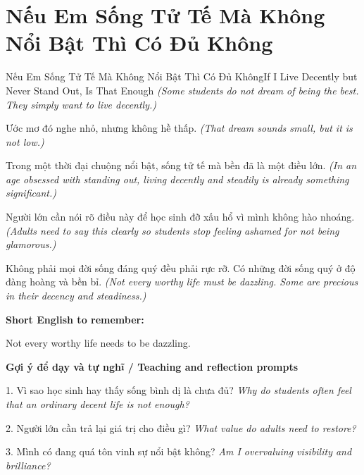 \section{Nếu Em Sống Tử Tế Mà Không Nổi Bật Thì Có Đủ Không}
\begin{truyen}{Nếu Em Sống Tử Tế Mà Không Nổi Bật Thì Có Đủ Không}{If I Live Decently but Never Stand Out, Is That Enough}
\textit{(Some students do not dream of being the best. They simply want to live decently.)}

Ước mơ đó nghe nhỏ, nhưng không hề thấp.
\textit{(That dream sounds small, but it is not low.)}

Trong một thời đại chuộng nổi bật, sống tử tế mà bền đã là một điều lớn.
\textit{(In an age obsessed with standing out, living decently and steadily is already something significant.)}

Người lớn cần nói rõ điều này để học sinh đỡ xấu hổ vì mình không hào nhoáng.
\textit{(Adults need to say this clearly so students stop feeling ashamed for not being glamorous.)}

\end{truyen}

\begin{baihoc}
Không phải mọi đời sống đáng quý đều phải rực rỡ. Có những đời sống quý ở độ đàng hoàng và bền bỉ.
\textit{(Not every worthy life must be dazzling. Some are precious in their decency and steadiness.)}
\end{baihoc}

\begin{ghinhoanh}
\textbf{Short English to remember:}

Not every worthy life needs to be dazzling.

\end{ghinhoanh}

\begin{tuhocnhanh}
\textbf{Gợi ý để dạy và tự nghĩ / Teaching and reflection prompts}

1. Vì sao học sinh hay thấy sống bình dị là chưa đủ? \textit{Why do students often feel that an ordinary decent life is not enough?}

2. Người lớn cần trả lại giá trị cho điều gì? \textit{What value do adults need to restore?}

3. Mình có đang quá tôn vinh sự nổi bật không? \textit{Am I overvaluing visibility and brilliance?}
\end{tuhocnhanh}
\ngancach

